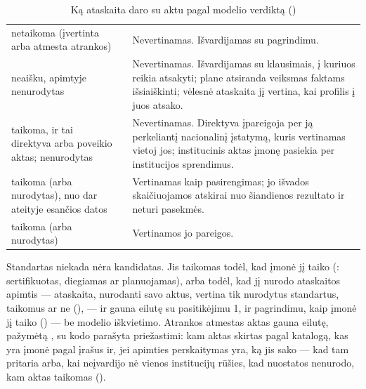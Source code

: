 \begin{table}[H]
\caption{Ką ataskaita daro su aktu pagal modelio verdiktą
()}\label{tab:report:assessment}
\begin{tabularx}{\textwidth}{@{}L{58mm}L{24mm}Y@{}}
\toprule
{} &  &  \\
\midrule
netaikoma (įvertinta arba atmesta atrankos) &  & Nevertinamas. Išvardijamas su pagrindimu. \\
neaišku, apimtyje nenurodytas &  & Nevertinamas. Išvardijamas su klausimais, į kuriuos reikia atsakyti; plane atsiranda veiksmas faktams išsiaiškinti; vėlesnė ataskaita jį vertina, kai profilis į juos atsako. \\
taikoma, ir tai direktyva arba  poveikio aktas; nenurodytas &  & Nevertinamas. Direktyva įpareigoja per ją perkeliantį nacionalinį įstatymą, kuris vertinamas vietoj jos; institucinis aktas įmonę pasiekia per institucijos sprendimus. \\
taikoma (arba nurodytas), nuo dar ateityje esančios datos &  & Vertinamas kaip pasirengimas; jo išvados skaičiuojamos atskirai nuo šiandienos rezultato ir neturi pasekmės. \\
taikoma (arba nurodytas) &  & Vertinamos jo pareigos. \\
\bottomrule
\end{tabularx}
\end{table}

Standartas niekada nėra kandidatas. Jis taikomas todėl, kad įmonė jį taiko
(: sertifikuotas, diegiamas ar planuojamas), arba todėl, kad jį nurodo
ataskaitos apimtis --- ataskaita, nurodanti savo aktus, vertina tik nurodytus standartus,
taikomus ar ne (), --- ir gauna eilutę  su pasitikėjimu 1,
  ir pagrindimu, kaip įmonė jį taiko () --- be
modelio iškvietimo. Atrankos atmestas aktas gauna  eilutę, pažymėtą
, su kodo parašyta priežastimi: kam aktas skirtas pagal katalogą, kas yra
įmonė pagal įrašus ir, jei apimties perskaitymas yra, ką jis sako --- kad tam pritaria arba,
kai neįvardijo nė vienos institucijų rūšies, kad nuostatos nenurodo, kam aktas taikomas
().

